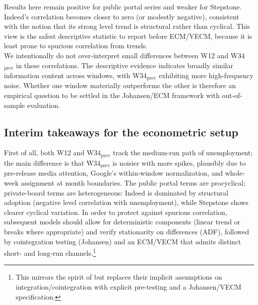 \documentclass[12pt,a4paper]{article}
\begin{document}
Results here remain positive for public portal series and weaker for Stepstone. 
Indeed’s correlation becomes closer to zero (or modestly negative), consistent with the notion that its strong level trend is structural rather than cyclical.
 This view is the safest descriptive statistic to report before ECM/VECM, because it is least prone to spurious correlation from trends.\\
 We intentionally do not over-interpret small differences between W12 and W34$_{\text{prev}}$ in these correlations. The descriptive evidence indicates broadly similar information content across windows, with W34$_{\text{prev}}$ exhibiting more high-frequency noise. Whether one window materially outperforms the other is therefore an empirical question to be settled in the Johansen/ECM framework with out-of-sample evaluation.
\subsection{Interim takeaways for the econometric setup}
First of all, both W12 and W34$_{\text{prev}}$ track the medium-run path of unemployment; the main difference is that W34$_{\text{prev}}$ is noisier with more spikes, plausibly due to pre-release media attention, Google’s within-window normalization, and whole-week assignment at month boundaries.
The public portal terms are procyclical; private-board terms are heterogeneous: Indeed is dominated by structural adoption (negative level correlation with unemployment), while Stepstone shows clearer cyclical variation.
In order to protect against spurious correlation, subsequent models should allow for deterministic components (linear trend or breaks where appropriate) and verify stationarity on differences (ADF), followed by cointegration testing (Johansen) and an ECM/VECM that admits distinct short- and long-run channels.\footnote{This mirrors the spirit of \citet{Zimmermann2009} but replaces their implicit assumptions on integration/cointegration with explicit pre-testing and a Johansen/VECM specification.}
\end{document}
